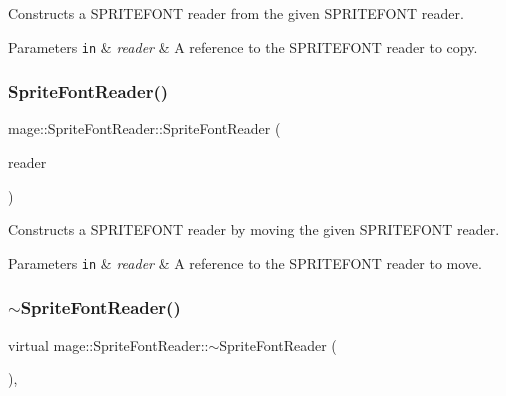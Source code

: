 Constructs a S\+P\+R\+I\+T\+E\+F\+O\+NT reader from the given S\+P\+R\+I\+T\+E\+F\+O\+NT reader.


\begin{DoxyParams}[1]{Parameters}
\mbox{\tt in}  & {\em reader} & A reference to the S\+P\+R\+I\+T\+E\+F\+O\+NT reader to copy. \\
\hline
\end{DoxyParams}
\hypertarget{classmage_1_1_sprite_font_reader_a2130816e03384c99af146a21795ac5e8}{}\label{classmage_1_1_sprite_font_reader_a2130816e03384c99af146a21795ac5e8} 
\subsubsection{\texorpdfstring{Sprite\+Font\+Reader()}{SpriteFontReader()}\hspace{0.1cm}{\footnotesize\ttfamily [3/3]}}
{\footnotesize\ttfamily mage\+::\+Sprite\+Font\+Reader\+::\+Sprite\+Font\+Reader (\begin{DoxyParamCaption}\item[{\hyperlink{classmage_1_1_sprite_font_reader}{Sprite\+Font\+Reader} \&\&}]{reader }\end{DoxyParamCaption})\hspace{0.3cm}{\ttfamily [delete]}}

Constructs a S\+P\+R\+I\+T\+E\+F\+O\+NT reader by moving the given S\+P\+R\+I\+T\+E\+F\+O\+NT reader.


\begin{DoxyParams}[1]{Parameters}
\mbox{\tt in}  & {\em reader} & A reference to the S\+P\+R\+I\+T\+E\+F\+O\+NT reader to move. \\
\hline
\end{DoxyParams}
\hypertarget{classmage_1_1_sprite_font_reader_a296715f88672f810a6e4b74f74840c53}{}\label{classmage_1_1_sprite_font_reader_a296715f88672f810a6e4b74f74840c53} 
\subsubsection{\texorpdfstring{$\sim$\+Sprite\+Font\+Reader()}{~SpriteFontReader()}}
{\footnotesize\ttfamily virtual mage\+::\+Sprite\+Font\+Reader\+::$\sim$\+Sprite\+Font\+Reader (\begin{DoxyParamCaption}{ }\end{DoxyParamCaption})\hspace{0.3cm}{\ttfamily [virtual]}, {\ttfamily [default]}}

